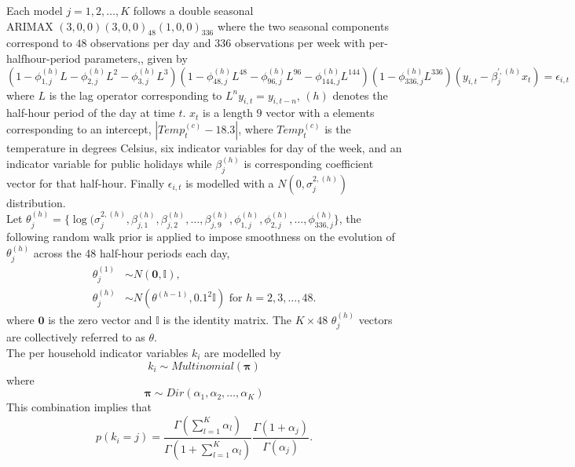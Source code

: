 \documentclass[12pt,a4paper]{article}\usepackage[]{graphicx}\usepackage[]{color}
\begin{document}
Each model $j = 1, 2, \ldots, K$ follows a double seasonal \\ ARIMAX $(3, 0, 0)(3, 0, 0)_{48}(1, 0, 0)_{336}$ where the two seasonal components correspond to $48$ observations per day and $336$ observations per week with per-halfhour-period parameters,, given by
\begin{equation}
\label{elec:dynamic}
(1 - \phi_{1, j}^{(h)}L - \phi_{2, j}^{(h)}L^2 - \phi_{3, j}^{(h)} L^3)(1 - \phi_{48, j}^{(h)}L^{48} - \phi_{96, j}^{(h)}L^{96} - \phi_{144, j}^{(h)}L^{144})(1 - \phi_{336, j}^{(h)}L^{336}) (y_{i, t} -  \beta^{\prime, {(h)}}_{j} x_{t}) = \epsilon_{i, t}
\end{equation}
where $L$ is the lag operator corresponding to $L^n y_{i, t} = y_{i, t- n}$, $(h)$ denotes the half-hour period of the day at time $t$. $x_{t}$ is a length $9$ vector with a elements corresponding to an intercept, $|Temp^{(c)}_{t} - 18.3|$, where $Temp^{(c)}_{t}$ is the temperature in degrees Celsius, six indicator variables for day of the week, and an indicator variable for public holidays while $\beta_{j}^{(h)}$ is corresponding coefficient vector for that half-hour. Finally $\epsilon_{i, t}$ is modelled with a $N(0, \sigma^{2, (h)}_{j})$ distribution.
\\

Let $\theta^{(h)}_j = \{\log(\sigma^{2, (h)}_{j}, \beta_{j, 1}^{(h)}, \beta_{j, 2}^{(h)}, \ldots, \beta_{j, 9}^{(h)}, \phi_{1, j}^{(h)}, \phi_{2, j}^{(h)}, \ldots, \phi_{336, j}^{(h)}\}$, the following random walk prior is applied to impose smoothness on the evolution of $\theta^{(h)}_j$ across the 48 half-hour periods each day,
\begin{align}
\label{elec:dynamicPrior}
\theta^{(1)}_j &\sim N(\boldsymbol{0}, \mathbb{I}), \\
\theta^{(h)}_j &\sim N(\theta^{(h-1)}, 0.1^2 \mathbb{I}) \mbox{ for } h = 2, 3, \ldots, 48.
\end{align}
where $\boldsymbol{0}$ is the zero vector and $\mathbb{I}$ is the identity matrix.
The $K \times 48$ $\theta^{(h)}_j$ vectors are collectively referred to as $\theta$.
\\

The per household indicator variables $k_i$ are modelled by
\begin{equation} 
\label{elec:kConditional}
k_i \sim Multinomial(\boldsymbol{\pi})
\end{equation}
where 
\begin{equation}
\label{elec:piPrior}
\boldsymbol{\pi} \sim Dir(\alpha_1, \alpha_2, \ldots, \alpha_K)
\end{equation}
This combination implies that
\begin{equation}
\label{elec:kMarginal}
p(k_i = j) = \frac{\Gamma(\sum_{l=1}^K \alpha_l)}{\Gamma(1 + \sum_{l=1}^K \alpha_l)} \frac{\Gamma(1 + \alpha_j)}{\Gamma(\alpha_j)}.
\end{equation}
\end{document}
